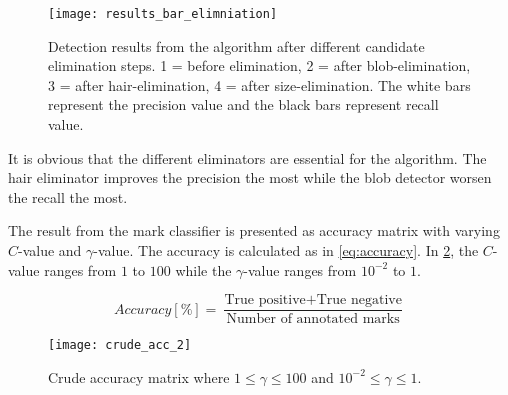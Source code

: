 \begin{figure}[h!]
	\centering
	\texttt{[image: results\_bar\_elimniation]}
	\caption{Detection results from the algorithm  after different candidate elimination steps. 1 = before elimination, 2 = after blob-elimination, 3 = after hair-elimination, 4 = after size-elimination. The white bars represent the precision value and the black bars represent recall value.  \label{fig:results_bar_elimniation}}
\end{figure}

It is obvious that the different eliminators are essential for the algorithm. The hair eliminator improves the precision the most while the blob detector worsen the recall the most.     





%
%
\newpage
The result from the mark classifier is presented as accuracy matrix with varying $C$-value and $\gamma$-value. The accuracy is calculated as in \eqref{eq:accuracy}. In \cref{fig:crude_acc}, the $C$-value ranges from $1$ to $100$ while the $\gamma$-value ranges from $10^{-2}$ to $1$.

\begin{equation} \label{eq:accuracy}
Accuracy [\%] = \frac{\text{True positive} + \text{True negative}}{\text{Number of annotated marks}}
\end{equation}

\begin{figure}[h!]
	\centering
	\texttt{[image: crude\_acc\_2]}
	\caption{Crude accuracy matrix where $1 \leq \gamma \leq 100$ and $10^{-2} \leq \gamma \leq 1$.
		 \label{fig:crude_acc}}
\end{figure}

